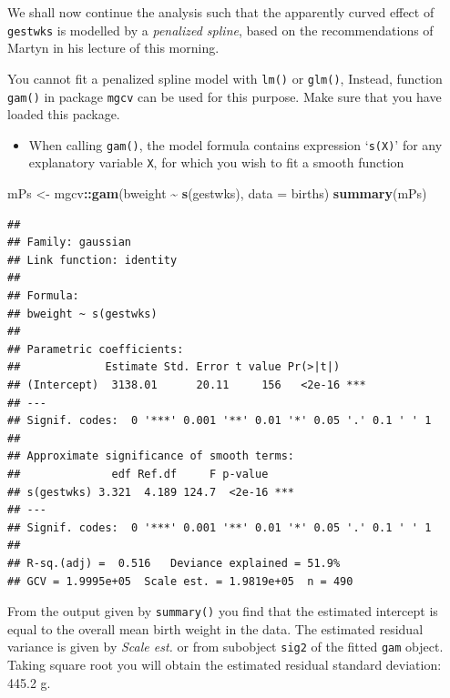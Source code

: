 \documentclass[
]{book}
\newenvironment{Shaded}{\begin{snugshade}}{\end{snugshade}}
\newcommand{\AttributeTok}[1]{\textcolor[rgb]{0.13,0.29,0.53}{#1}}
\newcommand{\FunctionTok}[1]{\textcolor[rgb]{0.13,0.29,0.53}{\textbf{#1}}}
\newcommand{\NormalTok}[1]{#1}
\newcommand{\OtherTok}[1]{\textcolor[rgb]{0.56,0.35,0.01}{#1}}
\newcommand{\SpecialCharTok}[1]{\textcolor[rgb]{0.81,0.36,0.00}{\textbf{#1}}}
\providecommand{\tightlist}{%
  \setlength{\itemsep}{0pt}\setlength{\parskip}{0pt}}
\begin{document}
We shall now continue the analysis such that the apparently curved effect
of \texttt{gestwks} is modelled by a \emph{penalized spline},
based on the recommendations of Martyn in his lecture of this morning.

You cannot fit a penalized spline model with \texttt{lm()} or
\texttt{glm()}, Instead, function \texttt{gam()} in package
\texttt{mgcv} can be used for this purpose. Make sure that you have loaded
this package.

\begin{itemize}
\tightlist
\item
  When calling \texttt{gam()}, the model formula contains
  expression `\texttt{s(X)}' for any explanatory variable \texttt{X},
  for which you wish to fit a smooth function
\end{itemize}

\begin{Shaded}
\begin{Highlighting}[]
\NormalTok{mPs }\OtherTok{\textless{}{-}}\NormalTok{ mgcv}\SpecialCharTok{::}\FunctionTok{gam}\NormalTok{(bweight }\SpecialCharTok{\textasciitilde{}} \FunctionTok{s}\NormalTok{(gestwks), }\AttributeTok{data =}\NormalTok{ births)}
\FunctionTok{summary}\NormalTok{(mPs)}
\end{Highlighting}
\end{Shaded}

\begin{verbatim}
## 
## Family: gaussian 
## Link function: identity 
## 
## Formula:
## bweight ~ s(gestwks)
## 
## Parametric coefficients:
##             Estimate Std. Error t value Pr(>|t|)    
## (Intercept)  3138.01      20.11     156   <2e-16 ***
## ---
## Signif. codes:  0 '***' 0.001 '**' 0.01 '*' 0.05 '.' 0.1 ' ' 1
## 
## Approximate significance of smooth terms:
##              edf Ref.df     F p-value    
## s(gestwks) 3.321  4.189 124.7  <2e-16 ***
## ---
## Signif. codes:  0 '***' 0.001 '**' 0.01 '*' 0.05 '.' 0.1 ' ' 1
## 
## R-sq.(adj) =  0.516   Deviance explained = 51.9%
## GCV = 1.9995e+05  Scale est. = 1.9819e+05  n = 490
\end{verbatim}

From the output given by \texttt{summary()} you find that the
estimated intercept is equal to the overall mean birth
weight in the data. The estimated residual variance is given by
\emph{Scale est.} or from subobject \texttt{sig2} of the fitted
\texttt{gam} object. Taking square root you will obtain the estimated
residual standard deviation: 445.2 g.
\end{document}
